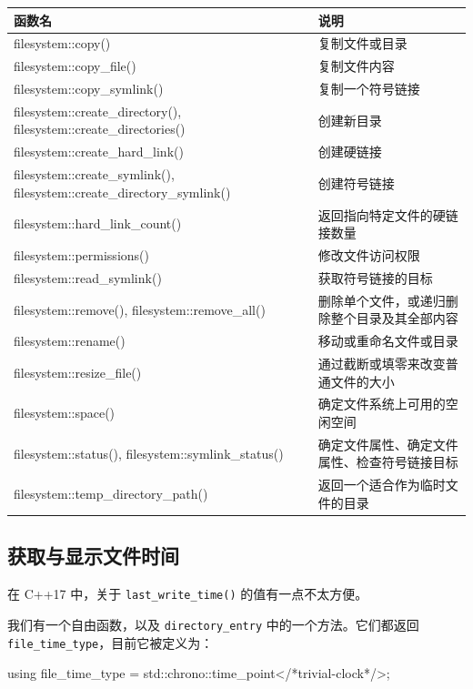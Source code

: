 
\begin{table}[H]
\centering
\begin{tabularx}{\textwidth}{>{\ttfamily\raggedright\arraybackslash}X >{\raggedright\arraybackslash}X}
\toprule
函数名 & 说明 \\
\midrule
filesystem::copy() & 复制文件或目录 \\
filesystem::copy\_file() & 复制文件内容 \\
filesystem::copy\_symlink() & 复制一个符号链接 \\
filesystem::create\_directory(), filesystem::create\_directories() & 创建新目录 \\
filesystem::create\_hard\_link() & 创建硬链接 \\
filesystem::create\_symlink(), filesystem::create\_directory\_symlink() & 创建符号链接 \\
filesystem::hard\_link\_count() & 返回指向特定文件的硬链接数量 \\
filesystem::permissions() & 修改文件访问权限 \\
filesystem::read\_symlink() & 获取符号链接的目标 \\
filesystem::remove(), filesystem::remove\_all() & 删除单个文件，或递归删除整个目录及其全部内容 \\
filesystem::rename() & 移动或重命名文件或目录 \\
filesystem::resize\_file() & 通过截断或填零来改变普通文件的大小 \\
filesystem::space() & 确定文件系统上可用的空闲空间 \\
filesystem::status(), filesystem::symlink\_status() & 确定文件属性、确定文件属性、检查符号链接目标 \\
filesystem::temp\_directory\_path() & 返回一个适合作为临时文件的目录 \\
\bottomrule
\end{tabularx}
\end{table}

\subsection{获取与显示文件时间}

在 C++17 中，关于 \texttt{last\_write\_time()} 的值有一点不太方便。

我们有一个自由函数，以及 \texttt{directory\_entry} 中的一个方法。它们都返回 \texttt{file\_time\_type}，目前它被定义为：

\begin{codebox}[cpp]
using file_time_type = std::chrono::time_point</*trivial-clock*/>;
\end{codebox}

